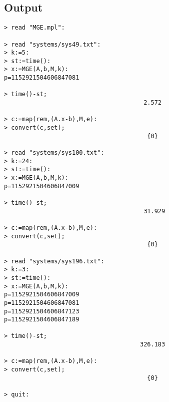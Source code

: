 \documentclass[10pt]{report}
\begin{document}
\subsection*{Output}
\begin{verbatim}
> read "MGE.mpl":
 
> read "systems/sys49.txt":
> k:=5:
> st:=time():
> x:=MGE(A,b,M,k):
p=1152921504606847081 

> time()-st;
                                       2.572

> c:=map(rem,(A.x-b),M,e):
> convert(c,set);
                                        {0}

> read "systems/sys100.txt":
> k:=24:
> st:=time():
> x:=MGE(A,b,M,k):
p=1152921504606847009 

> time()-st;
                                       31.929

> c:=map(rem,(A.x-b),M,e):
> convert(c,set);
                                        {0}

> read "systems/sys196.txt":
> k:=3:
> st:=time():
> x:=MGE(A,b,M,k):
p=1152921504606847009 
p=1152921504606847081 
p=1152921504606847123 
p=1152921504606847189 

> time()-st;
                                      326.183

> c:=map(rem,(A.x-b),M,e):
> convert(c,set);
                                        {0}

> quit:
\end{verbatim}
\end{document}
